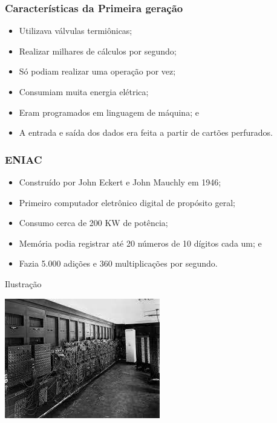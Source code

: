 \documentclass[aspectratio=169]{beamer} %
\begin{document}
\begin{frame}
	\frametitle{Características da Primeira gera\c cão}
	
	\begin{itemize}
		\item Utilizava válvulas termiônicas;
		\item Realizar milhares de cálculos por segundo;
		\item Só podiam realizar uma operação por vez;
		\item Consumiam muita energia elétrica;
		\item Eram programados em linguagem de máquina; e
		\item A entrada e saída dos dados era feita a partir de cartões perfurados.
	\end{itemize}
\end{frame}

\begin{frame}
	\frametitle{ENIAC}
	
	\begin{itemize}
		\item Construído por John Eckert e John Mauchly em 1946;
		\item Primeiro computador eletrônico digital de propósito geral;
		\item Consumo cerca de 200 KW de potência;
		\item Memória podia registrar até 20 números de 10 dígitos cada um; e 
		\item Fazia 5.000 adições e 360 multiplicações por segundo.
	\end{itemize}\vfill
	
	\begin{exampleblock}{Ilustra\c cão}
		\begin{center}
			\includegraphics[scale=0.4]{img/eniac}
		\end{center}
	\end{exampleblock}
\end{frame}
\end{document}
